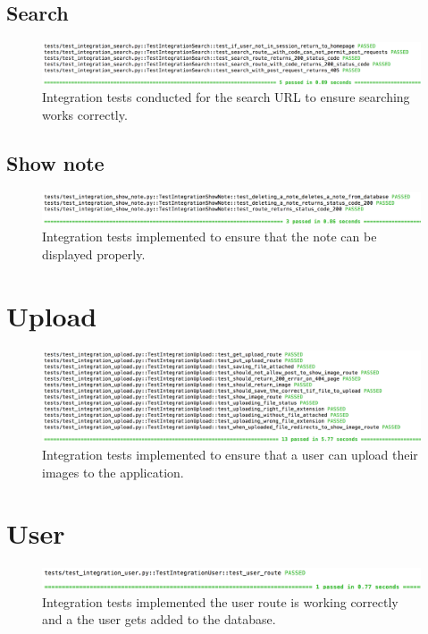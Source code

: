 \subsection{Search}
\begin{figure}[H]
  \centering
  \includegraphics[width=\textwidth]{images/test_integration_search}
  \caption{Integration tests conducted for the search URL to ensure searching works correctly.}
  \label{fig:integration_search}
\end{figure}

\subsection{Show note}
\begin{figure}[H]
  \centering
  \includegraphics[width=\textwidth]{images/test_integration_show_note}
  \caption{Integration tests implemented to ensure that the note can be displayed properly. }
  \label{fig:integration_show_note}
\end{figure}

\section{Upload}
\begin{figure}[H]
  \centering
  \includegraphics[width=\textwidth]{images/test_integration_upload}
  \caption{Integration tests implemented to ensure that a user can upload their images to the application. }
  \label{fig:integration_upload}
\end{figure}

\section{User}
\begin{figure}[H]
  \centering
  \includegraphics[width=\textwidth]{images/test_integration_user}
  \caption{Integration tests implemented the user route is working correctly and a the user gets added to the database.}
  \label{fig:integration_user}
\end{figure}

